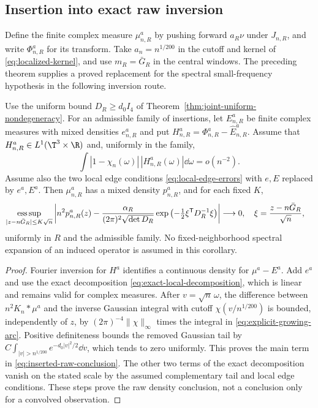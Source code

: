 \subsection{Insertion into exact raw inversion}
Define the finite complex measure $\mu^a_{n,R}$ by pushing forward
$a_R\nu$ under $J_{n,R}$, and write $\Phi^a_{n,R}$ for its transform.
Take $a_n=n^{1/200}$ in the cutoff and kernel of
\eqref{eq:localized-kernel}, and use $m_R=\bar G_R$ in the central
windows. The preceding theorem supplies a proved replacement for the
spectral small-frequency hypothesis in the following inversion route.

\begin{corollary}
\label{cor:raw-from-growing-arc}
Use the uniform bound $D_R\ge d_0 I_4$ of
Theorem~\ref{thm:joint-uniform-nondegeneracy}.
For an admissible family of insertions, let $E^a_{n,R}$ be finite complex
measures with mixed densities $e^a_{n,R}$ and put
$H^a_{n,R}=\Phi^a_{n,R}-\widehat E^a_{n,R}$. Assume that
$H^a_{n,R}\in L^1(\T^3\times\R)$ and, uniformly in the family,
\begin{equation}\label{eq:new-complementary-tail}
 \int |1-\chi_n(\omega)|\,|H^a_{n,R}(\omega)|\dd\omega=o(n^{-2}).
\end{equation}
Assume also the two local edge conditions
\eqref{eq:local-edge-errors} with $e,E$ replaced by $e^a,E^a$.
Then $\mu^a_{n,R}$ has a mixed density $p^a_{n,R}$, and for each fixed
$K$,
\begin{align}
 \mathop{\rm ess\,sup}_{|z-n\bar G_R|\le K\sqrt n}
 \left|n^2p^a_{n,R}(z)
 -\frac{\alpha_R}{(2\pi)^2\sqrt{\det D_R}}
   \exp\left(-\tfrac12\xi^{\mathsf T}D_R^{-1}\xi\right)\right|
 &\longrightarrow0,
 \quad \xi=\frac{z-n\bar G_R}{\sqrt n},
 \label{eq:inserted-raw-conclusion}
\end{align}
uniformly in $R$ and the admissible family. No fixed-neighborhood
spectral expansion of an induced operator is assumed in this corollary.
\end{corollary}
\begin{proof}
Fourier inversion for $H^a$ identifies a continuous density for
$\mu^a-E^a$. Add $e^a$ and use the exact decomposition
\eqref{eq:exact-local-decomposition}, which is linear and remains valid
for complex measures. After $v=\sqrt n\,\omega$, the difference between
$n^2K_n*\mu^a$ and the inverse Gaussian integral with cutoff
$\chi(v/n^{1/200})$ is bounded, independently of $z$, by
$(2\pi)^{-4}\|\chi\|_\infty$ times the integral in
\eqref{eq:explicit-growing-arc}. Positive definiteness bounds the
removed Gaussian tail by
$C\int_{|v|>n^{1/200}}e^{-d_0|v|^2/2}\dd v$, which tends to zero
uniformly. This proves the main term in
\eqref{eq:inserted-raw-conclusion}. The other two terms of the exact
decomposition vanish on the stated scale by the assumed complementary
tail and local edge conditions. These steps prove the raw density
conclusion, not a conclusion only for a convolved observation.
\end{proof}

